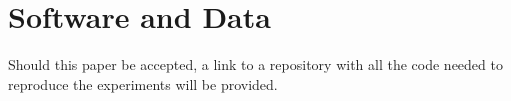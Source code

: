 \documentclass{article}
\begin{document}
\section*{Software and Data}

Should this paper be accepted, a link to a repository with all the code needed to reproduce the experiments will be provided.

\nocite{langley00}



\end{document}

